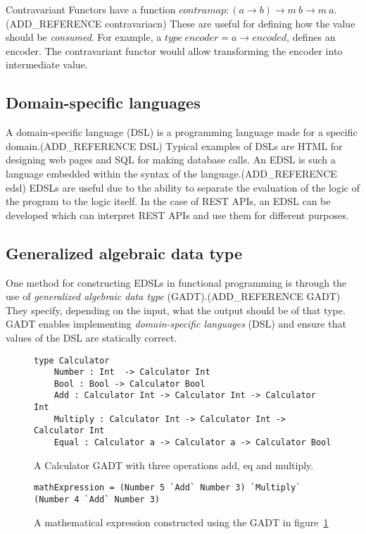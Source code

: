 Contravariant Functors have a function $contramap : (a\rightarrow b) \rightarrow
m\ b \rightarrow m\ a$. (ADD\_REFERENCE contravariacn) These are useful for
defining how the value should be \textit{consumed}. For example, a $type\
encoder = a\rightarrow encoded$, defines an encoder. The contravariant functor
would allow transforming the encoder into intermediate value.

\subsection{Domain-specific languages}

A domain-specific language (DSL) is a programming language made for a specific
domain.(ADD\_REFERENCE DSL) Typical examples of DSLs are HTML for designing web
pages and SQL for making database calls. An EDSL is such a language embedded
within the syntax of the language.(ADD\_REFERENCE edsl) EDSLs are useful due to
the ability to separate the evaluation of the logic of the program to the logic
itself. In the case of REST APIs, an EDSL can be developed which can
interpret REST APIs and use them for different purposes. 

\subsection{Generalized algebraic data type}\label{gadt}

One method for constructing EDSLs in functional programming is through the use
of \textit{generalized algebraic data type} (GADT).(ADD\_REFERENCE GADT)  They
specify, depending on the input, what the output should be of that type. GADT
enables implementing \textit{domain-specific languages} (DSL) and ensure
that values of the DSL are statically correct. 

\begin{figure}[H]
    \begin{lstlisting}
type Calculator 
    Number : Int  -> Calculator Int
    Bool : Bool -> Calculator Bool
    Add : Calculator Int -> Calculator Int -> Calculator Int
    Multiply : Calculator Int -> Calculator Int -> Calculator Int
    Equal : Calculator a -> Calculator a -> Calculator Bool
    \end{lstlisting}
    \caption{A Calculator GADT with three operations add, eq and multiply.}
    \label{gadtcalculator}
\end{figure}

\begin{figure}[H]
    \begin{lstlisting}
mathExpression = (Number 5 `Add` Number 3) `Multiply` (Number 4 `Add` Number 3)
    \end{lstlisting}
    \caption{A mathematical expression constructed using the GADT in
    figure~\ref{gadtcalculator}}
    \label{mathexpressiongadt}
\end{figure}


